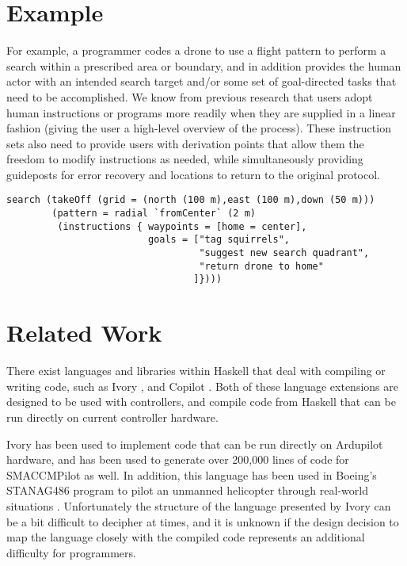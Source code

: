 \documentclass{sig-alternate-05-2015}
\begin{document}
\section{Example}
\label{sec:example}
For example, a programmer codes a drone to use a flight pattern to perform
a search within a prescribed area or boundary, and in addition provides the
human actor with an intended search target and/or some set of goal-directed
tasks that need to be accomplished. We know from previous research
\cite{abbott2015prog} that users adopt human instructions or programs more
readily when they are supplied in a linear fashion (giving the user a
high-level overview of the process). These instruction sets also need to
provide users with derivation points that allow them the freedom to modify
instructions as needed, while simultaneously providing guideposts for error
recovery and locations to return to the original protocol.

\begin{lstlisting}
search (takeOff (grid = (north (100 m),east (100 m),down (50 m)))
        (pattern = radial `fromCenter` (2 m)
         (instructions { waypoints = [home = center],
                         goals = ["tag squirrels",
                                  "suggest new search quadrant",
                                  "return drone to home"
                                 ]})))
\end{lstlisting}


\section{Related Work}
\label{sec:related}
There exist languages and libraries within Haskell that deal with compiling or
writing  code, such as Ivory \cite{elliot2015ivory}, and Copilot
\cite{pike2010copilot}. Both of these language extensions are designed to be
used with controllers, and compile  code from Haskell that can be
run directly on current controller hardware.

Ivory has been used to implement code that can be run directly on Ardupilot
hardware, and has been used to generate over 200,000 lines of code for
SMACCMPilot as well. In addition, this language has been used in Boeing's
STANAG486 program to pilot an unmanned helicopter through real-world
situations \cite{boeing2016auto}. Unfortunately the structure of the language
presented by Ivory can be a bit difficult to decipher at times, and it is
unknown if the design decision to map the language closely with the compiled
code represents an additional difficulty for programmers.
\end{document}
